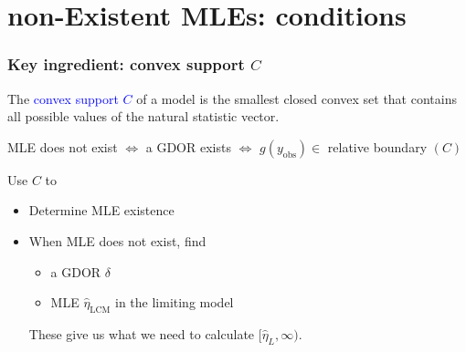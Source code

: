 \documentclass[ 10pt]{beamer}
\newcommand{\etaLCM}{\hat{\eta}_{\textrm{LCM}}}
\newcommand{\yobs}{y_{\text{obs}}}
\begin{document}
\section{non-Existent MLEs: conditions}
\frame
{
  \frametitle{Key ingredient: convex support $C$}  
The \textcolor{blue}{convex support $C$} of a model is the smallest closed convex set that contains 
all possible values of the natural statistic vector.
\vspace{2mm}

\begin{theorem} %
MLE does not exist $\iff$ a GDOR exists $\iff$ $g(\yobs) \in$ relative boundary $(C)$
\end{theorem}
\vspace{2mm}


Use $C$ to
\begin{itemize}
\item Determine MLE existence
\item When MLE does not exist, find
\begin{itemize}
	\item	a GDOR $\delta$
	\item 	MLE $\etaLCM$ in the limiting model
\end{itemize}
	These give us what we need to calculate $[\hat{\eta}_L, \infty)$.
\end{itemize}

}
\end{document}
